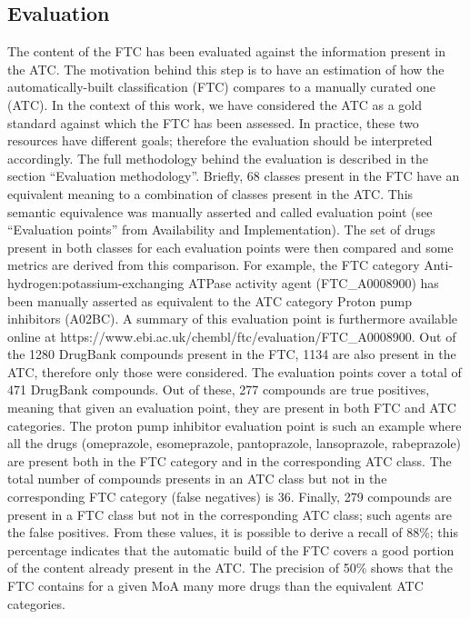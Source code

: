 \documentclass{bioinfo}
\begin{document}
\subsection{Evaluation}
The content of the FTC has been evaluated against the information present in the ATC. The motivation behind 
this step is to have an estimation of how the automatically-built classification (FTC) compares to a manually curated 
one (ATC). In the context of this work, we have considered the ATC as a gold standard against which the FTC 
has been assessed. In practice, these two resources have different goals; therefore the evaluation should be 
interpreted accordingly. The full methodology behind the evaluation is described in the section “Evaluation methodology”. 
Briefly, 68 classes present in the FTC have an equivalent meaning to a combination of classes present in the ATC. 
This semantic equivalence was manually asserted and called evaluation point (see “Evaluation points” from Availability and Implementation). 
The set of drugs present in both classes for each evaluation points were then compared and some metrics are derived 
from this comparison. For example, the FTC category Anti-hydrogen:potassium-exchanging ATPase activity agent (FTC\_A0008900) has 
been manually asserted as equivalent to the ATC category Proton pump inhibitors (A02BC). A summary of this 
evaluation point is furthermore available online at {{https://www.ebi.ac.uk/chembl/ftc/evaluation/FTC\_A0008900}}.
Out of the 1280 DrugBank compounds present in the FTC, 1134 are also present in the ATC, therefore only those were 
considered. The evaluation points cover a total of 471 DrugBank compounds. Out of these, 277 compounds are true positives, 
meaning that given an evaluation point, they are present in both FTC and ATC categories. The proton pump inhibitor 
evaluation point is such an example where all the drugs (omeprazole, esomeprazole, pantoprazole, lansoprazole, rabeprazole) are 
present both in the FTC category and in the corresponding ATC class. The total number of compounds presents in an ATC class but 
not in the corresponding FTC category (false negatives) is 36. Finally, 279 compounds are present in a FTC class but not in the 
corresponding ATC class; such agents are the false positives. From these values, it is possible to derive a 
recall of 88\%; this percentage indicates that the automatic build of the FTC covers a good portion of the content 
already present in the ATC. The precision of 50\% shows that the FTC contains for a given MoA many more drugs than the 
equivalent ATC categories.
\end{document}
